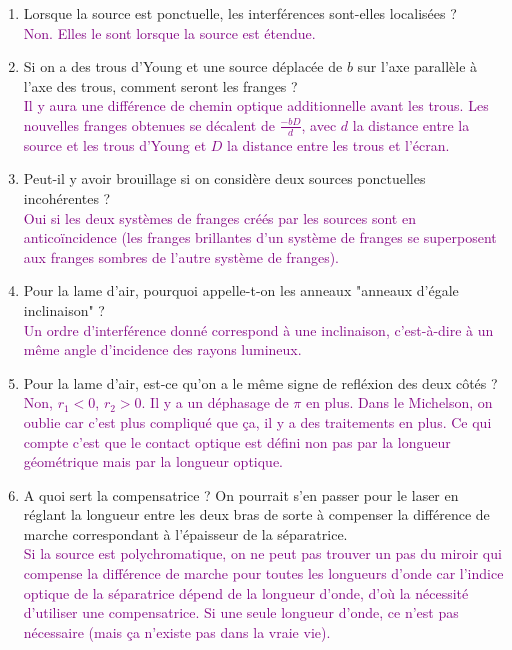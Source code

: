 \documentclass[french, a4paper, 10pt, twocolumn, landscape]{article}
\begin{document}
{\begin{enumerate}
  \item Lorsque la source est ponctuelle, les interférences sont-elles localisées ? \\
     \textcolor{purple}{Non. Elles le sont lorsque la source est étendue.}
     
  \item Si on a des trous d'Young et une source déplacée de $b$ sur l'axe parallèle à l'axe des trous, comment seront les franges ? \\
     \textcolor{purple}{Il y aura une différence de chemin optique additionnelle avant les trous. Les nouvelles franges obtenues se décalent de $\frac{-bD}{d}$, avec $d$ la distance entre la source et les trous d'Young et $D$ la distance entre les trous et l'écran.}
  
  \item Peut-il y avoir brouillage si on considère deux sources ponctuelles incohérentes ?\\
  \textcolor{purple}{Oui si les deux systèmes de franges créés par les sources sont en anticoïncidence (les franges brillantes d'un système de franges se superposent aux franges sombres de l'autre système de franges).}
     
  \item Pour la lame d'air, pourquoi appelle-t-on les anneaux "anneaux d'égale inclinaison" ? \\
     \textcolor{purple}{Un ordre d'interférence donné correspond à une inclinaison, c'est-à-dire à un même angle d'incidence des rayons lumineux.}
     
  \item Pour la lame d'air, est-ce qu'on a le même signe de refléxion des deux côtés ? \\
     \textcolor{purple}{Non, $r_1 < 0$, $r_2 > 0$. Il y a un déphasage de $\pi$ en plus. Dans le Michelson, on oublie car c'est plus compliqué que ça, il y a des traitements en plus. Ce qui compte c'est que le contact optique est défini non pas par la longueur géométrique mais par la longueur optique.}
  
  \item A quoi sert la compensatrice ? On pourrait s'en passer pour le laser en réglant la longueur entre les deux bras de sorte à compenser la différence de marche correspondant à l'épaisseur de la séparatrice. \\
     \textcolor{purple}{Si la source est polychromatique, on ne peut pas trouver un pas du miroir qui compense la différence de marche pour toutes les longueurs d'onde car l'indice optique de la séparatrice dépend de la longueur d'onde, d'où la nécessité d'utiliser une compensatrice. Si une seule longueur d'onde, ce n'est pas nécessaire (mais ça n'existe pas dans la vraie vie).}
  

\end{enumerate}}
\end{document}
